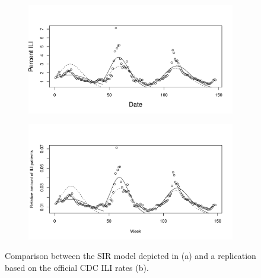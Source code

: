 \documentclass[11pt, a4paper,twoside]{report}\usepackage[]{graphicx}\usepackage[]{color}
\begin{document}
\begin{figure}[htbp!]
\centering
  \begin{subfigure}[t]{1\textwidth}
  \includegraphics[width=1\linewidth]{02_todd_bodnar_SIR.pdf}
  \caption{}
  \end{subfigure}
  
  \begin{subfigure}[t]{1\textwidth}
  \includegraphics[width=1\linewidth]{38_SIR_model_cdc_data_25.pdf}
  \caption{}
  \end{subfigure}
  \caption{Comparison between the SIR model depicted in \cite{bodnar_data_2015} (a) and a replication based on the official CDC ILI rates (b).}
  \label{fig:SIR_comparison_CDC}
\end{figure}
\end{document}
